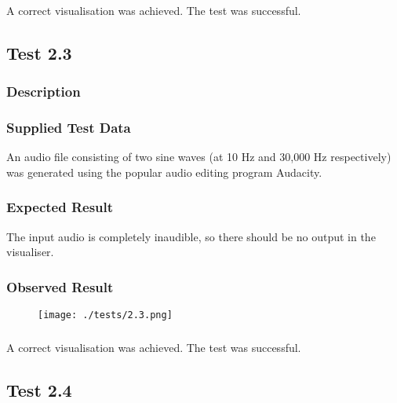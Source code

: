 \subsubsection{}
A correct visualisation was achieved. The test was successful.

\pagebreak
\subsection{Test 2.3}
\subsubsection{Description}
\paragraph{}
{
	\centering
}

\subsubsection{Supplied Test Data}
An audio file consisting of two sine waves (at 10 Hz and 30,000 Hz respectively) was generated using the popular audio editing program Audacity.

\subsubsection{Expected Result}
The input audio is completely inaudible, so there should be no output in the visualiser.

\subsubsection{Observed Result}
\label{sec:evidence2.3}
\begin{figure}[H]
	\texttt{[image: ./tests/2.3.png]}
\end{figure}

\subsubsection{}
A correct visualisation was achieved. The test was successful.

\pagebreak
\subsection{Test 2.4}

